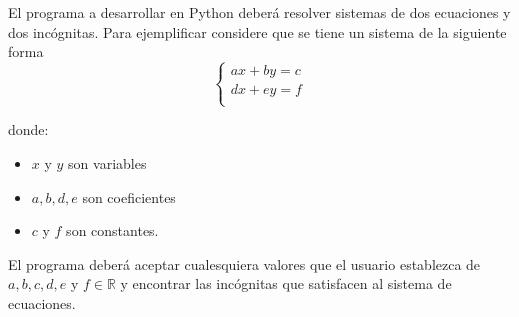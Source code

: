 \documentclass[letterpaper,12pt]{article}
\begin{document}
	El programa a desarrollar en Python deberá resolver sistemas de dos ecuaciones y dos incógnitas. Para ejemplificar considere que se tiene un sistema de la siguiente forma
	$$
		\begin{cases}
			ax + by = c \\
			dx + ey = f \\
		\end{cases}
	$$

	\noindent donde:
	\begin{itemize}
		\item $ x $ y $ y $ son variables
		\item $ a,b,d,e $ son coeficientes
		\item $ c $ y $ f $ son constantes.
	\end{itemize}

	El programa deberá aceptar cualesquiera valores que el usuario establezca de $ a,b,c,d,e $ y $ f \in \mathbb{R} $ y encontrar las incógnitas que satisfacen al sistema de ecuaciones.
	
\end{document}
